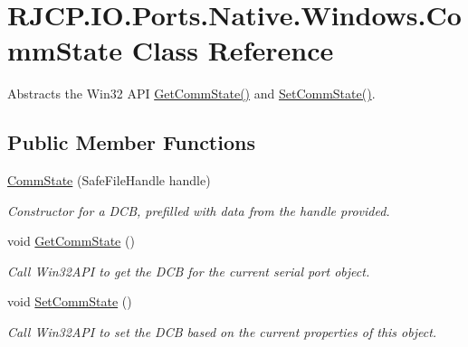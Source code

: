 \hypertarget{class_r_j_c_p_1_1_i_o_1_1_ports_1_1_native_1_1_windows_1_1_comm_state}{}\section{R\+J\+C\+P.\+I\+O.\+Ports.\+Native.\+Windows.\+Comm\+State Class Reference}
\label{class_r_j_c_p_1_1_i_o_1_1_ports_1_1_native_1_1_windows_1_1_comm_state}


Abstracts the Win32 A\+PI \mbox{\hyperlink{class_r_j_c_p_1_1_i_o_1_1_ports_1_1_native_1_1_windows_1_1_comm_state_a49fb7ac8787598bf4f135c6a867ec59e}{Get\+Comm\+State()}} and \mbox{\hyperlink{class_r_j_c_p_1_1_i_o_1_1_ports_1_1_native_1_1_windows_1_1_comm_state_a0a20f9d712c5ad860155845b1dffd56b}{Set\+Comm\+State()}}.  


\subsection*{Public Member Functions}
\begin{DoxyCompactItemize}
\item 
\mbox{\hyperlink{class_r_j_c_p_1_1_i_o_1_1_ports_1_1_native_1_1_windows_1_1_comm_state_ad765599175205c01fa309c8e7f11c42f}{Comm\+State}} (Safe\+File\+Handle handle)
\begin{DoxyCompactList}\small\item\em Constructor for a D\+CB, prefilled with data from the handle provided. \end{DoxyCompactList}\item 
void \mbox{\hyperlink{class_r_j_c_p_1_1_i_o_1_1_ports_1_1_native_1_1_windows_1_1_comm_state_a49fb7ac8787598bf4f135c6a867ec59e}{Get\+Comm\+State}} ()
\begin{DoxyCompactList}\small\item\em Call Win32\+A\+PI to get the D\+CB for the current serial port object. \end{DoxyCompactList}\item 
void \mbox{\hyperlink{class_r_j_c_p_1_1_i_o_1_1_ports_1_1_native_1_1_windows_1_1_comm_state_a0a20f9d712c5ad860155845b1dffd56b}{Set\+Comm\+State}} ()
\begin{DoxyCompactList}\small\item\em Call Win32\+A\+PI to set the D\+CB based on the current properties of this object. \end{DoxyCompactList}\end{DoxyCompactItemize}

